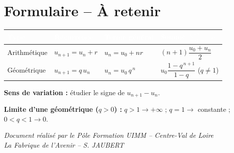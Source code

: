 \documentclass[a4paper,11pt]{article}
\begin{document}
\newpage
\section*{Formulaire -- À retenir}

\begin{tcolorbox}[colback=uimmlightblue, colframe=uimmblue, title={\textbf{Formulaire des suites numériques}}, fonttitle=\large\bfseries\sffamily, coltitle=white, boxrule=1.5pt, arc=5pt]

\renewcommand{\arraystretch}{1.8}
\begin{tabular}{|>{\centering\arraybackslash}m{3cm}|>{\centering\arraybackslash}m{2.2cm}|>{\centering\arraybackslash}m{4cm}|>{\centering\arraybackslash}m{4cm}|}
\hline
\rowcolor{uimmblue}
\textcolor{white}{\textbf{Type}} & \textcolor{white}{\textbf{Récurrence}} & \textcolor{white}{\textbf{Terme général}} & \textcolor{white}{\textbf{Somme $\sum_{k=0}^{n} u_k$}} \\
\hline
Arithmétique & $u_{n+1} = u_n + r$ & $u_n = u_0 + nr$ & $(n+1)\dfrac{u_0 + u_n}{2}$ \\
\hline
Géométrique & $u_{n+1} = q\,u_n$ & $u_n = u_0\,q^{\,n}$ & $u_0\dfrac{1 - q^{\,n+1}}{1 - q}$ \;($q \neq 1$) \\
\hline
\end{tabular}

\vspace{8pt}
\textbf{Sens de variation :} étudier le signe de $u_{n+1} - u_n$.

\vspace{4pt}
\textbf{Limite d'une géométrique ($q>0$) :} $q>1 \to +\infty$ ; \; $q=1 \to$ constante ; \; $0<q<1 \to 0$.
\end{tcolorbox}

\vfill
\begin{center}
\color{uimmgray}\small
\textit{Document réalisé par le Pôle Formation UIMM -- Centre-Val de Loire}\\
\textit{La Fabrique de l'Avenir -- S. JAUBERT}
\end{center}
\end{document}
